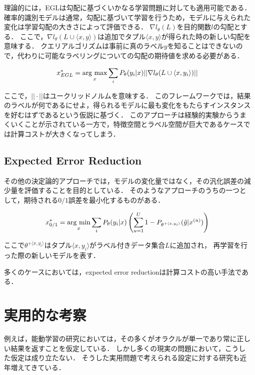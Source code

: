 \documentclass[11pt]{report}
\newcommand{\argmax}{\mathop{\rm arg~max}\limits}
\newcommand{\argmin}{\mathop{\rm arg~min}\limits}
\begin{document}
理論的には，EGLは勾配に基づくいかなる学習問題に対しても適用可能である．
確率的識別モデルは通常，勾配に基づいて学習を行うため，モデルに与えられた変化は学習勾配の大きさによって評価できる．
$\nabla l_{\theta}(L)$を目的関数$l$の勾配とする．
ここで，$\nabla l_{\theta}(L \cup \langle x, y\rangle)$は追加でタプル$\langle x, y \rangle$が得られた時の新しい勾配を意味する．
クエリアルゴリズムは事前に真のラベル$y$を知ることはできないので，代わりに可能なラベリングについての勾配の期待値を求める必要がある．

\begin{equation}
    x_{EGL}^* = \argmax_{x} \sum_{i} P_{\theta}(y_i|x) || \nabla l_{\theta}(L \cup \langle x, y_i \rangle)||
\end{equation}

ここで，$||\cdot||$はユークリッドノルムを意味する．
このフレームワークでは，結果のラベルが何であるにせよ，得られるモデルに最も変化をもたらすインスタンスを好むはずであるという仮説に基づく．
このアプローチは経験的実験からうまくいくことが示されている一方で，特徴空間とラベル空間が巨大であるケースでは計算コストが大きくなってしまう．

\subsection{Expected Error Reduction}
その他の決定論的アプローチでは，モデルの変化量ではなく，その汎化誤差の減少量を評価することを目的としている．
そのようなアプローチのうちの一つとして，期待される$0/1$誤差を最小化するものがある．

\begin{equation}
    x_{0/1}^* = \argmin_{x} \sum_{i} P_{\theta}(y_i|x) \left(\sum^U_{u=1} 1 - P_{\theta^{+\langle x, y_i \rangle}}(\hat{y}|x^{(u)})\right)
\end{equation}

ここで$\theta^{+\langle x, y_i \rangle}$はタプル$\langle x, y_i \rangle$がラベル付きデータ集合$L$に追加され，
再学習を行った際の新しいモデルを表す．

多くのケースにおいては，expected error reductionは計算コストの高い手法である．

\section{実用的な考察}
例えば，能動学習の研究においては，その多くがオラクルが単一であり常に正しい結果を返すことを仮定している．
しかし多くの現実の問題において，こうした仮定は成り立たない．
そうした実用問題で考えられる設定に対する研究も近年増えてきている．
\end{document}
